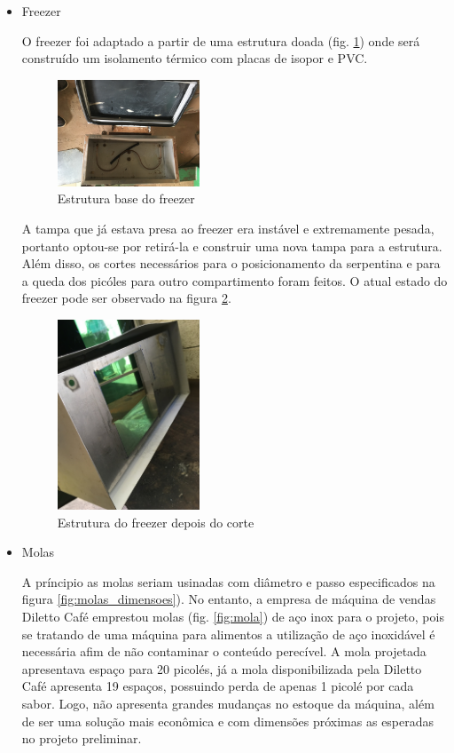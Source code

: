 \begin{itemize}
\newpage

\item Freezer

O freezer foi adaptado a partir de uma estrutura doada (fig. \ref{fig:freezer}) onde será construído um isolamento térmico com placas de isopor e PVC.

   \begin{figure}[H]
	\centering
    \includegraphics[width=0.4\textwidth]{figuras/freezer}
    \caption{Estrutura base do freezer}
    \label{fig:freezer}
\end{figure}

A tampa que já estava presa ao freezer era instável e extremamente pesada, portanto optou-se por retirá-la e construir uma nova tampa para a estrutura. Além disso, os cortes necessários para o posicionamento da serpentina e para a queda dos picóles para outro compartimento foram feitos. O atual estado do freezer pode ser observado na figura \ref{fig:freezer_cortado}.

   \begin{figure}[H]
	\centering
   \includegraphics[width=0.4\textwidth]{figuras/freezer_cortado}
    \caption{Estrutura do freezer depois do corte}
    \label{fig:freezer_cortado}
	\end{figure}

\item Molas

A príncipio as molas seriam usinadas com diâmetro e passo especificados na figura \ref{fig:molas_dimensoes}). No entanto, a empresa de máquina de vendas Diletto Café emprestou molas (fig. \ref{fig:mola}) de aço inox  para o projeto, pois se tratando de uma máquina para alimentos a utilização de aço inoxidável é necessária afim de não contaminar o conteúdo perecível. A mola projetada apresentava espaço para 20 picolés, já a mola disponibilizada pela Diletto Café apresenta 19 espaços, possuindo perda de apenas 1 picolé por cada sabor. Logo, não apresenta grandes mudanças no estoque da máquina, além de ser uma solução mais econômica e com dimensões próximas as esperadas no projeto preliminar.


\end{itemize}

